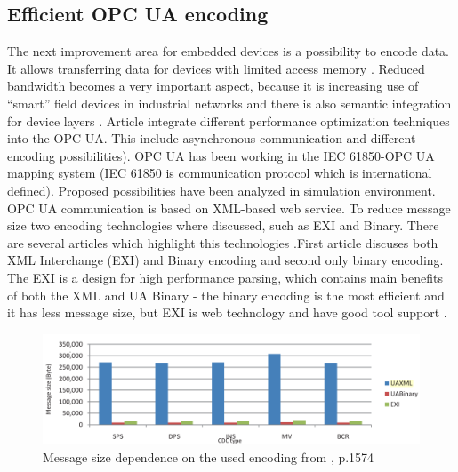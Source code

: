 \documentclass[conference]{IEEEtran}
\begin{document}
\subsection{Efficient OPC UA encoding}
The next improvement area for embedded devices is a possibility to encode data. It allows transferring data for devices with limited access memory \cite{efficient2016binaryencoding}. Reduced bandwidth becomes a very important aspect, because it is increasing use of “smart” field devices in industrial networks and there is also semantic integration for device layers \cite{efficient2016binaryencoding}. Article \cite{middleware2014optimizing} integrate different performance optimization techniques into the OPC UA. This include asynchronous communication and different encoding possibilities). OPC UA has been working in the IEC 61850-OPC UA mapping system (IEC 61850 is communication protocol which is international defined). Proposed possibilities have been analyzed in simulation environment. OPC UA communication is based on XML-based web service. To reduce message size two encoding technologies where discussed, such as EXI and Binary. There are several articles which highlight this technologies \cite{efficient2016binaryencoding} \cite{middleware2014optimizing}.First \cite{middleware2014optimizing} article discuses both XML Interchange (EXI) and Binary encoding and second only binary encoding. The EXI is a design for high performance parsing, which contains main benefits of both the XML and UA Binary - the binary encoding is the most efficient and it has less message size, but EXI is web technology and have good tool support \cite{middleware2014optimizing}.

\begin{figure}[ht]
\centering
\includegraphics[width=1\linewidth]{Figures/encoding}\quad
\caption[Subfigure example]{\label{f:encoding}Message size dependence on the used encoding from \cite{middleware2014optimizing}, p.1574}
\end{figure}
 
\end{document}
